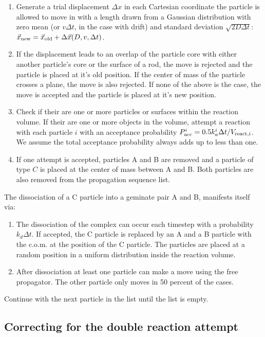 \begin{enumerate}
\item Generate a trial displacement $\Delta x$ in each Cartesian coordinate the particle is allowed to move in with a length drawn from a Gaussian distribution with zero mean (or $v \Delta t$, in the case with drift) and standard deviation $\sqrt{2D\Delta t}$: $\vec{x}_{\rm new} = \vec{x}_{\rm old} + \Delta \vec{x}(D,v,\Delta t)$.
\item If the displacement leads to an overlap of the particle core with either another particle's core or the surface of a rod, the move is rejected and the particle is placed at it's old position. If the center of mass of the particle crosses a plane, the move is also rejected. If none of the above is the case, the move is accepted and the particle is placed at it's new position.
\item Check if their are one or more particles or surfaces within the reaction volume. If their are one or more objects in the volume, attempt a reaction with each particle $i$ with an acceptance probability $P_{\rm acc}^i = 0.5 k_{a}^i \Delta t/V_{\rm react, i}$. We assume the total acceptance probability always adds up to less than one. 
\item If one attempt is accepted, particles A and B are removed and a particle of type $C$ is placed at the center of mass between A and B. Both particles are also removed from the propagation sequence list. 
\end{enumerate}

The dissociation of a C particle into a geminate pair A and B, manifests itself via:

\begin{enumerate}
\item The dissociation of the complex can occur each timestep with a probability $k_d \Delta t$. If accepted, the C particle is replaced by an A and a B particle with the c.o.m. at the position of the C particle. The particles are placed at a random position in a uniform distribution inside the reaction volume.
\item After dissociation at least one particle can make a move using the free propagator. The other particle only moves in 50 percent of the cases. 
\end{enumerate}
Continue with the next particle in the list until the list is empty.


\subsection{Correcting for the double reaction attempt}

